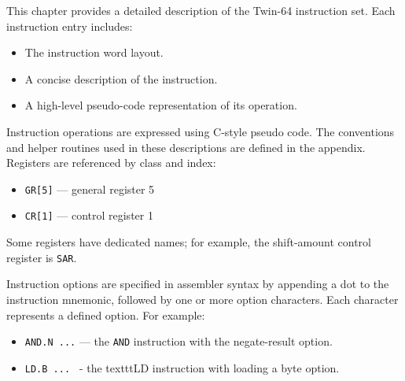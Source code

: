 %
%

This chapter provides a detailed description of the Twin-64 instruction set. Each instruction entry includes:

\begin{itemize}
	\setlength{\itemsep}{0.2em}
    \setlength{\topsep}{0pt}
    \setlength{\parskip}{0pt}
    \setlength{\parsep}{0pt}
    \item The instruction word layout.
    \item A concise description of the instruction.
    \item A high-level pseudo-code representation of its operation.
\end{itemize}


Instruction operations are expressed using C-style pseudo code. The conventions and helper routines used in these descriptions are defined in the appendix. Registers are referenced by class and index:

\begin{itemize}
    \setlength{\itemsep}{0.2em}
    \setlength{\topsep}{0pt}
    \setlength{\parskip}{0pt}
    \setlength{\parsep}{0pt}
    \item \texttt{GR[5]} — general register 5
    \item \texttt{CR[1]} — control register 1
\end{itemize}

Some registers have dedicated names; for example, the shift-amount control register is \texttt{SAR}.


Instruction options are specified in assembler syntax by appending a dot to the instruction mnemonic, followed by one or more option characters. Each character represents a defined option. For example:

\begin{itemize}
    \setlength{\itemsep}{0.2em}
    \setlength{\topsep}{0pt}
    \setlength{\parskip}{0pt}
    \setlength{\parsep}{0pt}
    \item \texttt{AND.N ...} — the \texttt{AND} instruction with the negate-result option.
    \item \texttt{LD.B ... } - the texttt{LD} instruction with loading a byte option.    
\end{itemize}

